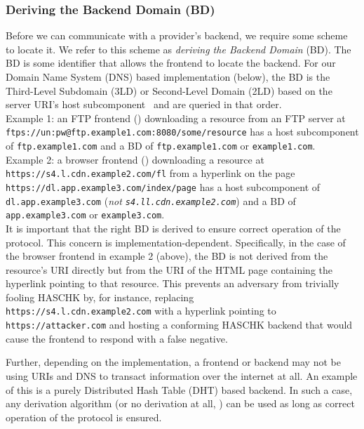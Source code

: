\subsubsection{Deriving the Backend Domain (BD)}

Before we can communicate with a provider's backend, we require some scheme to
locate it. We refer to this scheme as \emph{deriving the Backend Domain} (BD).
The BD is some identifier that allows the frontend to locate the backend. For
our Domain Name System (DNS) based implementation (below), the BD is the
Third-Level Subdomain (3LD) or Second-Level Domain (2LD) based on the server
URI's host subcomponent~\cite{RFC3986} and are queried in that order. \\

Example 1: an FTP frontend () downloading a
resource from an FTP server at
\texttt{ftps://un:pw@ftp.example1.com:8080/some/resource} has a host
subcomponent of \texttt{ftp.example1.com} and a BD of \texttt{ftp.example1.com}
or \texttt{example1.com}. \\

Example 2: a browser frontend () downloading a resource at \texttt{https://s4.l.cdn.example2.com/fl}
from a hyperlink on the page \\\texttt{https://dl.app.example3.com/index/page} has
a host subcomponent of \\\texttt{dl.app.example3.com} (\emph{not
\texttt{s4.ll.cdn.example2.com}}) and a BD of \texttt{app.example3.com} or
\texttt{example3.com}. \\

It is important that the right BD is derived to ensure correct operation of the
protocol. This concern is implementation-dependent. Specifically, in the case of
the browser frontend in example 2 (above), the BD is not derived from the
resource's URI directly but from the URI of the HTML page containing the
hyperlink pointing to that resource. This prevents an adversary from trivially
fooling HASCHK by, for instance, replacing
\\\texttt{https://s4.l.cdn.example2.com} with a hyperlink pointing to
\texttt{https://attacker.com} and hosting a conforming HASCHK backend that
would cause the frontend to respond with a false negative.

Further, depending on the implementation, a frontend or backend may not be using
URIs and DNS to transact information over the internet at all. An example of
this is a purely Distributed Hash Table (DHT) based backend. In such a case, any
derivation algorithm (or no derivation at all, ) can be
used as long as correct operation of the protocol is ensured.

